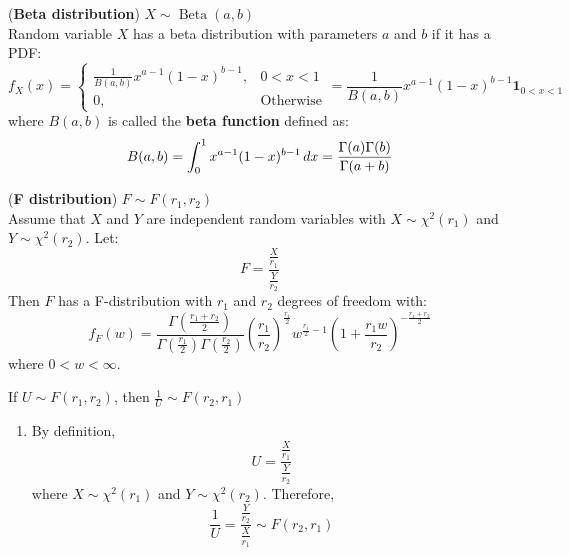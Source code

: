 \documentclass{huhtakm-template-book}
\DeclareMathOperator{\Beta}{Beta}
\begin{document}
\newpage
\begin{eg}(\textbf{Beta distribution}) $X\sim\Beta(a,b)$\\
	Random variable $X$ has a beta distribution with parameters $a$ and $b$ if it has a PDF:
	\begin{equation*}
		f_{X}(x)=\begin{cases}
			\frac{1}{B(a,b)}x^{a-1}(1-x)^{b-1}, &0<x<1\\
			0, &\text{Otherwise}
		\end{cases}=\frac{1}{B(a,b)}x^{a-1}(1-x)^{b-1}\mathbf{1}_{0<x<1}
	\end{equation*}
	where $B(a,b)$ is called the \textbf{beta function} defined as:
	\begin{equation*}
		B(a,b)=\int_{0}^{1}x^{a-1}(1-x)^{b-1}\,dx=\frac{\Gamma(a)\Gamma(b)}{\Gamma(a+b)}
	\end{equation*}
\end{eg}
\begin{eg}(\textbf{F distribution}) $F\sim F(r_{1},r_{2})$\\
	Assume that $X$ and $Y$ are independent random variables with $X\sim\chi^{2}(r_{1})$ and $Y\sim\chi^{2}(r_{2})$. Let:
	\begin{equation*}
		F=\frac{\frac{X}{r_{1}}}{\frac{Y}{r_{2}}}
	\end{equation*}
	Then $F$ has a F-distribution with $r_{1}$ and $r_{2}$ degrees of freedom with:
	\begin{equation*}
		f_{F}(w)=\frac{\Gamma\left(\frac{r_{1}+r_{2}}{2}\right)}{\Gamma\left(\frac{r_{1}}{2}\right)\Gamma\left(\frac{r_{2}}{2}\right)}\left(\frac{r_{1}}{r_{2}}\right)^{\frac{r_{1}}{2}}w^{\frac{r_{1}}{2}-1}\left(1+\frac{r_{1}w}{r_{2}}\right)^{-\frac{r_{1}+r_{2}}{2}}
	\end{equation*}
	where $0<w<\infty$.
\end{eg}
\begin{lem}
	If $U\sim F(r_{1},r_{2})$, then $\frac{1}{U}\sim F(r_{2},r_{1})$
\end{lem}
\begin{proofing}
	\begin{enumerate}
		\item By definition,
		\begin{equation*}
			U=\frac{\frac{X}{r_{1}}}{\frac{Y}{r_{2}}}
		\end{equation*}
		where $X\sim\chi^{2}(r_{1})$ and $Y\sim\chi^{2}(r_{2})$. Therefore,
		\begin{equation*}
			\frac{1}{U}=\frac{\frac{Y}{r_{2}}}{\frac{X}{r_{1}}}\sim F(r_{2},r_{1})
		\end{equation*}
	\end{enumerate}
\end{proofing}
\end{document}
